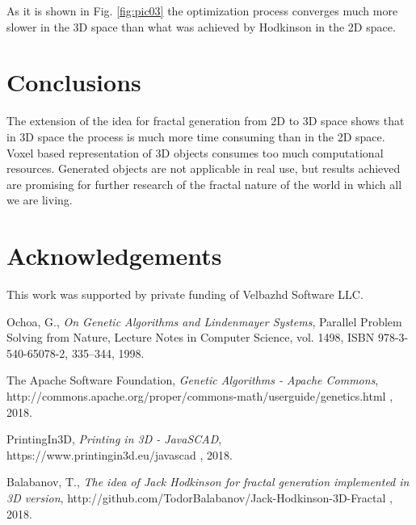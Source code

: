 \documentclass{llncs}
\begin{document}
As it is shown in Fig. \ref{fig:pic03} the optimization process converges much more slower in the 3D space than what was achieved by Hodkinson in the 2D space.

\section{Conclusions} \label{Conclusions}

The extension of the idea for fractal generation from 2D to 3D space shows that in 3D space the process is much more time consuming than in the 2D space. Voxel based representation of 3D objects consumes too much computational resources. Generated objects are not applicable in real use, but results achieved are promising for further research of the fractal nature of the world in which all we are living. 

\section*{Acknowledgements}
This work was supported by private funding of Velbazhd Software LLC.

\begin{thebibliography}{99}

 Ochoa, G., \textit{On Genetic Algorithms and Lindenmayer Systems}, Parallel Problem Solving from Nature, Lecture Notes in Computer Science, vol. 1498, ISBN 978-3-540-65078-2, 335--344, 1998.

 The Apache Software Foundation, \textit{Genetic Algorithms - Apache Commons}, http://commons.apache.org/proper/commons-math/userguide/genetics.html , 2018.

 PrintingIn3D, \textit{Printing in 3D - JavaSCAD}, https://www.printingin3d.eu/javascad , 2018.

 Balabanov, T., \textit{The idea of Jack Hodkinson for fractal generation implemented in 3D version}, http://github.com/TodorBalabanov/Jack-Hodkinson-3D-Fractal , 2018.

\end{thebibliography}
\end{document}

